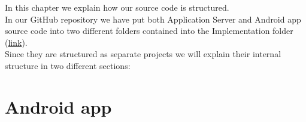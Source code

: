 In this chapter we explain how our source code is structured. \\
In our GitHub repository we have put both Application Server and Android app source code into two different folders contained into the Implementation folder (\href{https://github.com/JustSalva/MelziPinaSalvadore/tree/master/Implementation}{\color{blue}link}). \\
Since they are structured as separate projects we will explain their internal structure in two different sections:
\section{Android app}
\begin{figure}[H]
\end{figure}

